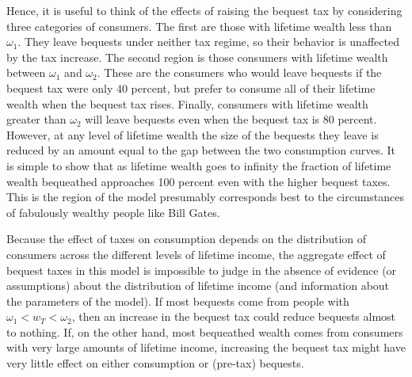 \documentclass[titlepage,12pt]{article}
\begin{document}
Hence, it is useful to think of the effects of raising the bequest tax 
by considering three categories of consumers.  The first are those 
with lifetime wealth less than $\omega_{1}$.  They leave bequests 
under neither tax regime, so their behavior is unaffected by the tax 
increase.  The second region is those consumers with lifetime wealth 
between $\omega_{1}$ and $\omega_{2}$.  These are the consumers who 
would leave bequests if the bequest tax were only 40 percent, but 
prefer to consume all of their lifetime wealth when the bequest tax 
rises.  Finally, consumers with lifetime wealth greater than 
$\omega_{2}$ will leave bequests even when the bequest tax is 80 
percent.  However, at any level of lifetime wealth the size of the 
bequests they leave is reduced by an amount equal to the gap between 
the two consumption curves.  It is simple to show that as lifetime 
wealth goes to infinity the fraction of lifetime wealth bequeathed 
approaches 100 percent even with the higher bequest taxes.  This is 
the region of the model presumably corresponds best to the 
circumstances of fabulously wealthy people like Bill Gates.



Because the effect of taxes on consumption depends on the distribution 
of consumers across the different levels of lifetime income, the 
aggregate effect of bequest taxes in this model is impossible to judge 
in the absence of evidence (or assumptions) about the distribution of 
lifetime income (and information about the parameters of the model).  
If most bequests come from people with $\omega_{1} < w_{T} < 
\omega_{2}$, then an increase in the bequest tax could reduce bequests 
almost to nothing.  If, on the other hand, most bequeathed wealth 
comes from consumers with very large amounts of lifetime income, 
increasing the bequest tax might have very little effect on either 
consumption or (pre-tax) bequests.
\end{document}
